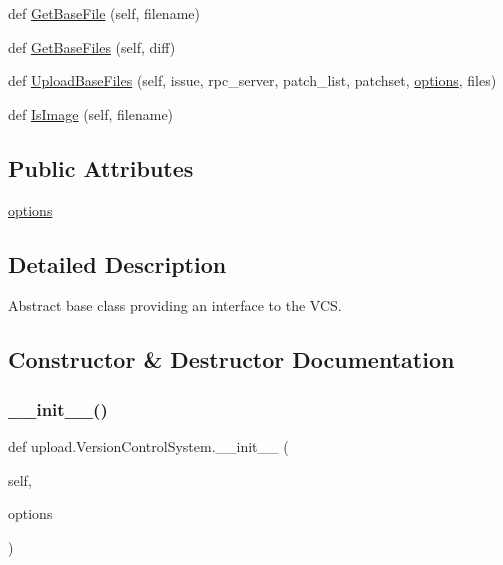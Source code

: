 \begin{DoxyCompactItemize}
\item 
def \hyperlink{classupload_1_1_version_control_system_adfd9d4ecba422102233a2ba13e5bfaf5}{Get\+Base\+File} (self, filename)
\item 
def \hyperlink{classupload_1_1_version_control_system_a812c3b3daf90c88b015fa4b26252e291}{Get\+Base\+Files} (self, diff)
\item 
def \hyperlink{classupload_1_1_version_control_system_a7e334f967301b9e85e5a9c39f5036823}{Upload\+Base\+Files} (self, issue, rpc\+\_\+server, patch\+\_\+list, patchset, \hyperlink{classupload_1_1_version_control_system_a4d57d043bc408887b94269fe4cea9556}{options}, files)
\item 
def \hyperlink{classupload_1_1_version_control_system_a846889ecd2ef40870b456ddb5b349e02}{Is\+Image} (self, filename)
\end{DoxyCompactItemize}
\subsection*{Public Attributes}
\begin{DoxyCompactItemize}
\item 
\hyperlink{classupload_1_1_version_control_system_a4d57d043bc408887b94269fe4cea9556}{options}
\end{DoxyCompactItemize}


\subsection{Detailed Description}
\begin{DoxyVerb}Abstract base class providing an interface to the VCS.\end{DoxyVerb}
 

\subsection{Constructor \& Destructor Documentation}
\mbox{\label{classupload_1_1_version_control_system_ace97e5785a2b40011404ae6fbb956ecf}} 
\subsubsection{\texorpdfstring{\+\_\+\+\_\+init\+\_\+\+\_\+()}{\_\_init\_\_()}\hspace{0.1cm}{\footnotesize\ttfamily [1/2]}}
{\footnotesize\ttfamily def upload.\+Version\+Control\+System.\+\_\+\+\_\+init\+\_\+\+\_\+ (\begin{DoxyParamCaption}\item[{}]{self,  }\item[{}]{options }\end{DoxyParamCaption})}

